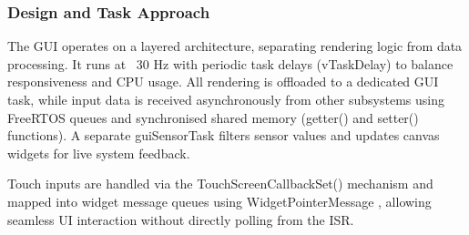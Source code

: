 \documentclass[a4paper, 11pt, titlepage]{article}
\begin{document}
\subsubsection{Design and Task Approach}
The GUI operates on a layered architecture, separating rendering logic from data processing. It runs at ~30 Hz with periodic task delays (vTaskDelay) \parencite{freertos} to balance responsiveness and CPU usage. All rendering is offloaded to a dedicated GUI task, while input data is received asynchronously from other subsystems using FreeRTOS queues and synchronised shared memory (getter() and setter() functions). A separate guiSensorTask filters sensor values and updates canvas widgets for live system feedback.

Touch inputs are handled via the TouchScreenCallbackSet() \parencite{grlib} mechanism and mapped into widget message queues using WidgetPointerMessage \parencite{grlib}, allowing seamless UI interaction without directly polling from the ISR.\\
\end{document}
